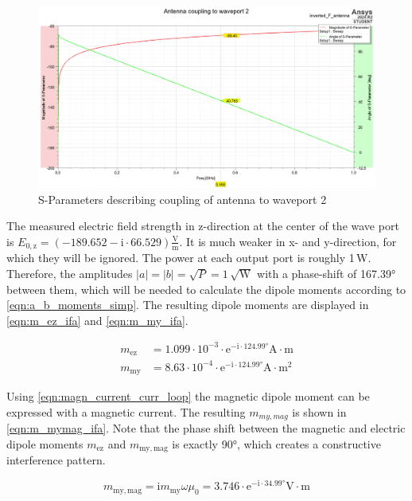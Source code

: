 \begin{figure}[h]
    \centering
    \includegraphics[width=1\linewidth]{Documentation//content//30_simulations//img/antenna_waveport2_sparams.png}
    \caption{S-Parameters describing coupling of antenna to waveport 2}
    \label{fig:antenna_waveport2_sparams}
\end{figure}

The measured electric field strength in z-direction at the center of the wave port is $E_{0,\mathrm{z}}=(-189.652 -\mathrm{i}\cdot66.529)\mathrm{\frac{V}{m}}$. It is much weaker in x- and y-direction, for which they will be ignored. The power at each output port is roughly 1\,W. Therefore, the amplitudes $|a|=|b|=\sqrt{P}=1\,\mathrm{\sqrt{W}}$ with a phase-shift of 167.39° between them, which will be needed to calculate the dipole moments according to \autoref{eqn:a_b_moments_simp}. The resulting dipole moments are displayed in \autoref{eqn:m_ez_ifa} and \autoref{eqn:m_my_ifa}.

\begin{align}
m_{\mathrm{ez}}&=1.099\cdot10^{-3}\cdot\mathrm{e}^{-\mathrm{i}\cdot124.99°}\mathrm{A\cdot m}\label{eqn:m_ez_ifa}\\
m_{\mathrm{my}}&=8.63\cdot10^{-4}\cdot\mathrm{e}^{-\mathrm{i}\cdot 124.99°}\mathrm{A\cdot m^2}\label{eqn:m_my_ifa}
\end{align}

Using \autoref{eqn:magn_current_curr_loop} the magnetic dipole moment can be expressed with a magnetic current. The resulting $m_{my,mag}$ is shown in \autoref{eqn:m_mymag_ifa}. Note that the phase shift between the magnetic and electric dipole moments $m_{\mathrm{ez}}$ and $m_{\mathrm{my,mag}}$ is exactly 90°, which creates a constructive interference pattern.

\begin{equation}
    m_{\mathrm{my,mag}}=\mathrm{i}m_{\mathrm{my}}\omega\mu_0=3.746\cdot\mathrm{e}^{-\mathrm{i}\cdot34.99°}\mathrm{V\cdot m}
    \label{eqn:m_mymag_ifa}
\end{equation}


